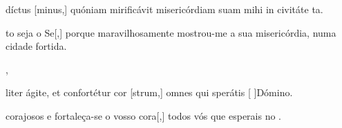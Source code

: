 {  %
  {\item {}díctus [minus,] quóniam mirificávit misericórdiam suam mihi in civitáte ta.}%
    {\item {}to seja o Se[,] porque maravilhosamente mos\-trou-me a sua misericórdia, numa cidade fortida.},
  {\item {}liter ágite, et confortétur cor [strum,] omnes qui sperátis [ ]{Dó}mino.}
    {\item {} corajosos e fortaleça-se o vosso cora[,] todos vós que esperais no .}
}